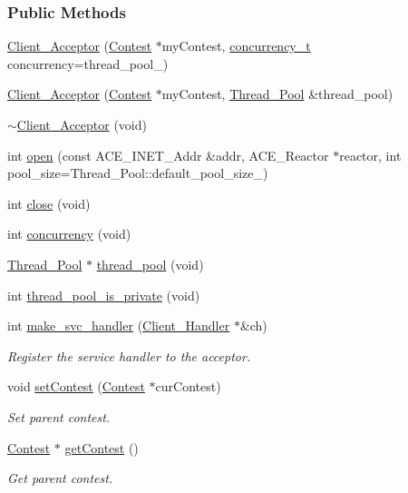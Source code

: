 \subsubsection*{Public Methods}
\begin{CompactItemize}
\item 
\hyperlink{classClient__Acceptor_Client__Acceptora0}{Client\_\-Acceptor} (\hyperlink{classContest}{Contest} $\ast$my\-Contest, \hyperlink{classClient__Acceptor_Client__Acceptors4}{concurrency\_\-t} concurrency=thread\_\-pool\_\-)
\item 
\hyperlink{classClient__Acceptor_Client__Acceptora1}{Client\_\-Acceptor} (\hyperlink{classContest}{Contest} $\ast$my\-Contest, \hyperlink{classThread__Pool}{Thread\_\-Pool} \&thread\_\-pool)
\item 
\hyperlink{classClient__Acceptor_Client__Acceptora2}{$\sim$Client\_\-Acceptor} (void)
\item 
int \hyperlink{classClient__Acceptor_Client__Acceptora3}{open} (const ACE\_\-INET\_\-Addr \&addr, ACE\_\-Reactor $\ast$reactor, int pool\_\-size=Thread\_\-Pool::default\_\-pool\_\-size\_\-)
\item 
int \hyperlink{classClient__Acceptor_Client__Acceptora4}{close} (void)
\item 
int \hyperlink{classClient__Acceptor_Client__Acceptora5}{concurrency} (void)
\item 
\hyperlink{classThread__Pool}{Thread\_\-Pool} $\ast$ \hyperlink{classClient__Acceptor_Client__Acceptora6}{thread\_\-pool} (void)
\item 
int \hyperlink{classClient__Acceptor_Client__Acceptora7}{thread\_\-pool\_\-is\_\-private} (void)
\item 
int \hyperlink{classClient__Acceptor_Client__Acceptora8}{make\_\-svc\_\-handler} (\hyperlink{classClient__Handler}{Client\_\-Handler} $\ast$\&ch)
\begin{CompactList}\small\item\em Register the service handler to the acceptor.\item\end{CompactList}\item 
void \hyperlink{classClient__Acceptor_Client__Acceptora9}{set\-Contest} (\hyperlink{classContest}{Contest} $\ast$cur\-Contest)
\begin{CompactList}\small\item\em Set parent contest.\item\end{CompactList}\item 
\hyperlink{classContest}{Contest} $\ast$ \hyperlink{classClient__Acceptor_Client__Acceptora10}{get\-Contest} ()
\begin{CompactList}\small\item\em Get parent contest.\item\end{CompactList}\end{CompactItemize}
